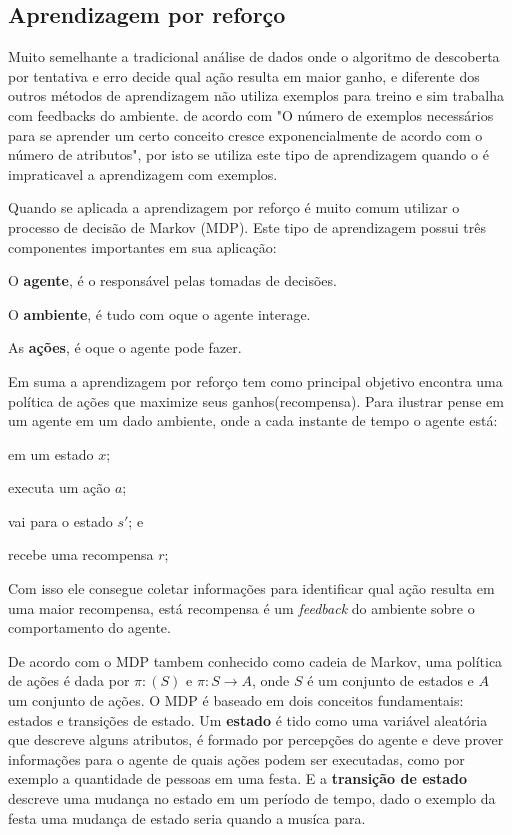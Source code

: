 \subsection{Aprendizagem por reforço}
\label{subsec:reforcing-learning}
 
Muito semelhante a tradicional análise de dados onde o algoritmo de descoberta por tentativa e erro
decide qual ação resulta em maior ganho, e diferente dos outros métodos de aprendizagem não utiliza exemplos para treino
e sim trabalha com feedbacks do ambiente. de acordo com \cite{Valiant:1984:TL:1968.1972} "O número de exemplos necessários para 
se aprender um certo conceito cresce exponencialmente de acordo com o número de atributos", por isto se utiliza este tipo de aprendizagem
quando o é impraticavel a aprendizagem com exemplos.


Quando se aplicada a aprendizagem por reforço é muito comum utilizar o processo de decisão de Markov (MDP). 
Este tipo de aprendizagem possui três componentes importantes em sua aplicação:
\begin{alineas}
	\item O \textbf{agente}, é o responsável pelas tomadas de decisões.
	\item O \textbf{ambiente}, é tudo com oque o agente interage.
	\item As \textbf{ações}, é oque o agente pode fazer.
\end{alineas}  
 Em suma a aprendizagem por reforço tem como principal objetivo encontra uma política de ações que maximize seus ganhos(recompensa). Para ilustrar 
 pense em um agente em um dado ambiente, onde a cada instante de tempo o agente está:   
\begin{alineascomponto}
	\item em um estado $x$;
	\item executa um ação $a$;
	\item vai para o estado $s'$; e
	\item recebe uma recompensa $r$;
\end{alineascomponto}
Com isso ele consegue coletar informações para identificar qual ação resulta em uma maior recompensa,
está recompensa é um \textit{feedback} do ambiente sobre o comportamento do agente. 
 
De acordo com o MDP tambem conhecido como cadeia de Markov, uma política de ações é dada por $\pi: (S)$
e $\pi: S \rightarrow A $, onde $S$ é um conjunto de estados e $A$ um conjunto de ações. 
O MDP é baseado em dois conceitos fundamentais: \cite{hordijk1992} estados e transições de estado.
Um \textbf{estado} é tido como uma variável aleatória que descreve alguns atributos, é formado por percepções do agente e deve
prover informações para o agente de quais ações podem ser executadas, como por exemplo a quantidade de pessoas em uma festa.
E a \textbf{transição de estado} descreve uma mudança no estado em um período de tempo, 
dado o exemplo da festa uma mudança de estado seria quando a musíca para.

